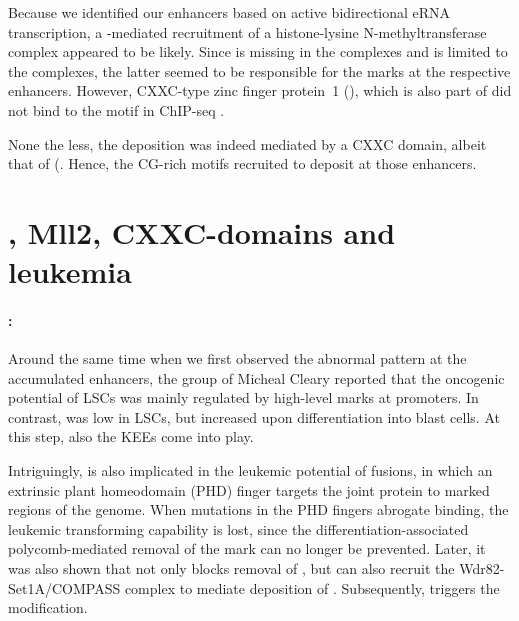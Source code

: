 Because we identified our enhancers based on active bidirectional eRNA transcription, a -mediated recruitment of a histone-lysine N-methyl\-trans\-ferase complex appeared to be likely. Since  is missing in the  complexes\cite{Wu2008a} and is limited to the  complexes, the latter seemed to be responsible for the \hisfourthree marks at the respective enhancers. However, CXXC-type zinc finger protein~1 (), which is also part of \cite{Lee2005,Clouaire2012,Cao2016} did not bind to the motif in ChIP-seq \dns.

None the less, the \hisfourthree deposition was indeed mediated by a CXXC domain, albeit that of   (. Hence, the CG-rich motifs  recruited  to deposit \hisfourthree at those enhancers. 

\section{\hisfourthree, Mll2, CXXC-domains and leukemia}
\label{chap:d:enhancers:mechanism:hisfourthreeleukemiaimportance}

\paragraph{\hisfourthree:} Around the same time when we first observed the abnormal \hisfourthree pattern at the accumulated enhancers, the group of Micheal Cleary reported that the oncogenic potential of \mllafnine LSCs was mainly regulated by high-level \hisfourthree marks at promoters\cite{Wong2015}. In contrast, \hisseventyninetwo was low in LSCs, but increased upon differentiation into \kitlow blast cells. At this step, also the KEEs come into play. 

Intriguingly, \hisfourthree is also implicated in the leukemic potential of  fusions, in which an extrinsic plant homeodomain (PHD) finger targets the joint protein to \hisfourthree marked regions of the genome\cite{Wang2009}. When mutations in the PHD fingers abrogate \hisfourthree binding, the leukemic transforming capability is lost, since the differentiation-associated polycomb-mediated removal of the mark can no longer be prevented\cite{Wang2009}. Later, it was also shown that  not only blocks removal of \hisfourthree, but can also recruit the Wdr82-Set1A/COMPASS complex to mediate deposition of \hisfourthree \cite{Franks2017}.  Subsequently, \hisfourthree triggers the \histwentysevenac modification\cite{Morgan2017a}. 

